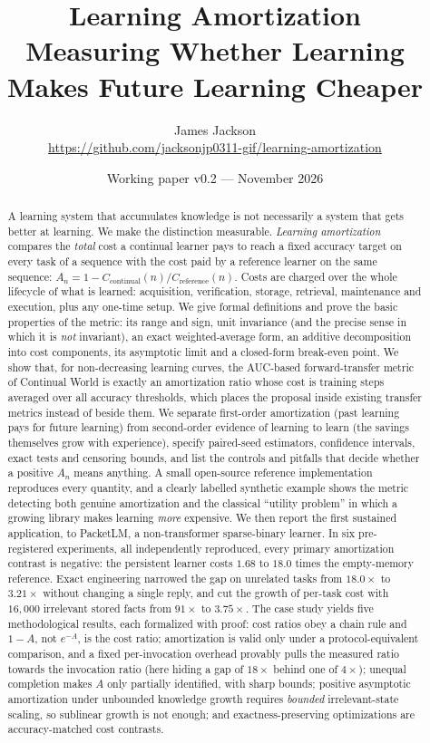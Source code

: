 \documentclass[11pt]{article}
\title{\textbf{Learning Amortization}\\[2pt]
\large Measuring Whether Learning Makes Future Learning Cheaper}
\author{James Jackson\\
\small\url{https://github.com/jacksonjp0311-gif/learning-amortization}}
\date{Working paper v0.2 --- November 2026}
\theoremstyle{remark}
\begin{document}
\maketitle

\begin{abstract}
A learning system that accumulates knowledge is not necessarily a system that gets better at learning.
We make the distinction measurable.
\emph{Learning amortization} compares the \emph{total} cost a continual learner pays to reach a fixed accuracy target on every task of a sequence with the cost paid by a reference learner on the same sequence:
$A_n = 1 - C_{\text{continual}}(n)/C_{\text{reference}}(n)$.
Costs are charged over the whole lifecycle of what is learned: acquisition, verification, storage, retrieval, maintenance and execution, plus any one-time setup.
We give formal definitions and prove the basic properties of the metric: its range and sign, unit invariance (and the precise sense in which it is \emph{not} invariant), an exact weighted-average form, an additive decomposition into cost components, its asymptotic limit and a closed-form break-even point.
We show that, for non-decreasing learning curves, the AUC-based forward-transfer metric of Continual World is exactly an amortization ratio whose cost is training steps averaged over all accuracy thresholds, which places the proposal inside existing transfer metrics instead of beside them.
We separate first-order amortization (past learning pays for future learning) from second-order evidence of learning to learn (the savings themselves grow with experience), specify paired-seed estimators, confidence intervals, exact tests and censoring bounds, and list the controls and pitfalls that decide whether a positive $A_n$ means anything.
A small open-source reference implementation reproduces every quantity, and a clearly labelled synthetic example shows the metric detecting both genuine amortization and the classical ``utility problem'' in which a growing library makes learning \emph{more} expensive.
We then report the first sustained application, to PacketLM, a non-transformer sparse-binary learner. In six pre-registered experiments, all independently reproduced, every primary amortization contrast is negative: the persistent learner costs $1.68$ to $18.0$ times the empty-memory reference. Exact engineering narrowed the gap on unrelated tasks from $18.0\times$ to $3.21\times$ without changing a single reply, and cut the growth of per-task cost with $16{,}000$ irrelevant stored facts from $91\times$ to $3.75\times$. The case study yields five methodological results, each formalized with proof: cost ratios obey a chain rule and $1-A$, not $e^{-A}$, is the cost ratio; amortization is valid only under a protocol-equivalent comparison, and a fixed per-invocation overhead provably pulls the measured ratio towards the invocation ratio (here hiding a gap of $18\times$ behind one of $4\times$); unequal completion makes $A$ only partially identified, with sharp bounds; positive asymptotic amortization under unbounded knowledge growth requires \emph{bounded} irrelevant-state scaling, so sublinear growth is not enough; and exactness-preserving optimizations are accuracy-matched cost contrasts.
\end{abstract}
\end{document}
